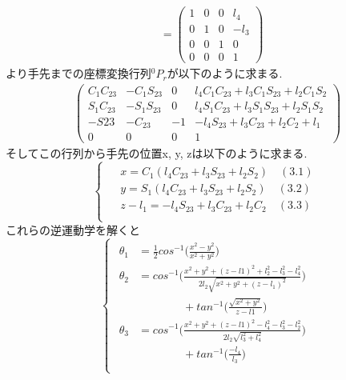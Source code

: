 \documentclass[a4j]{jarticle}			%
\begin{document}
\begin{multicols}{2}
\begin{equation*}
\begin{array}{cccc}
		&=
		\left( 
		\begin{array}{cccc}
			1 & 0 & 0 & l_4\\
			0 & 1 & 0 & -l_3\\
			0 & 0 & 1 & 0\\
			0 & 0 & 0 & 1 
		\end{array}
		\right)
	\end{array}
\end{equation*}
\normalsize
より手先までの座標変換行列$^{0}P_{r}$が以下のように求まる.
\tiny
\begin{equation*}
	\begin{array}{cc}
		\left( 
			\begin{array}{cccc}
				C_1C_{23} & -C_1S_{23} & 0 & l_4C_1C_{23}+l_3C_1S_{23}+l_2C_1S_2 \\
				S_1C_{23} & -S_1S_{23} & 0 & l_4S_1C_{23}+l_3S_1S_{23}+l_2S_1S_2 \\
				-S{23} & -C_{23} & -1 & -l_4S_{23}+l_3C_{23}+l_2C_2+l_1 \\
				0 & 0 & 0 & 1 
			\end{array}
		\right)
	\end{array}
\end{equation*}
\small
そしてこの行列から手先の位置x, y, zは以下のように求まる.
\begin{equation*}
	\left\{
		\begin{array}{c}
		\begin{split}
			&x=C_1(l_4C_{23}+l_3S_{23}+l_2S_2)\quad(3.1) \\
			&y=S_1(l_4C_{23}+l_3S_{23}+l_2S_2)\quad(3.2) \\
			&z-l_1=-l_4S_{23}+l_3C_{23}+l_2C_2\quad(3.3) \\
		\end{split}
	\end{array}
	\right.
\end{equation*}
これらの逆運動学を解くと
\tiny
\begin{equation}
	\left\{
		\begin{array}{c}
		\begin{split}
			\theta_1&=\frac{1}{2}cos^{-1}\biggl( \frac{x^2-y^2}{x^2+y^2} \biggr) \\
			\theta_2&= cos^{-1}\biggl( \frac{x^2+y^2+(z-l1)^2+l_2^2-l_3^2-l_4^2}{2l_    2\sqrt{x^2+y^2+(z-l_1)^2}} \biggr)\\
			&\qquad\qquad+tan^{-1}\biggl( \frac{\sqrt{x^2+y^2}}{z-l1}\biggr) \\
			\theta_3&=cos^{-1}\biggl( \frac{x^2+y^2+(z-l1)^2-l_4^2-l_3^2-l_2^2}{2l_2    \sqrt{l_3^2+l_4^2}}\biggr)\\
			&\qquad\qquad+tan^{-1}\biggl( \frac{-l_4}{l_3}\biggr)\\
		\end{split}
		\end{array}
	\right.
\end{equation}
\normalsize


\end{multicols}
\end{document}
